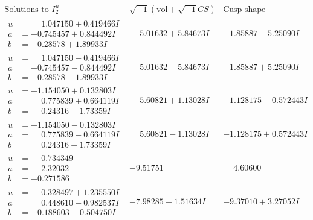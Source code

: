 \documentclass[1p]{elsarticle_modified}
\theoremstyle{definition}
\newcommand{\I}{\sqrt{-1}}
\begin{document}
$$\begin{array}{c|c|c}  
\text{Solutions to }I^u_{2}& \I (\text{vol} + \sqrt{-1}CS) & \text{Cusp shape}\\
 \hline 
\begin{aligned}
u &= \phantom{-}1.047150 + 0.419466 I \\
a &= -0.745457 + 0.844492 I \\
b &= -0.28578 + 1.89933 I\end{aligned}
 & \phantom{-}5.01632 + 5.84673 I & -1.85887 - 5.25090 I \\ \hline\begin{aligned}
u &= \phantom{-}1.047150 - 0.419466 I \\
a &= -0.745457 - 0.844492 I \\
b &= -0.28578 - 1.89933 I\end{aligned}
 & \phantom{-}5.01632 - 5.84673 I & -1.85887 + 5.25090 I \\ \hline\begin{aligned}
u &= -1.154050 + 0.132803 I \\
a &= \phantom{-}0.775839 + 0.664119 I \\
b &= \phantom{-}0.24316 + 1.73359 I\end{aligned}
 & \phantom{-}5.60821 + 1.13028 I & -1.128175 - 0.572443 I \\ \hline\begin{aligned}
u &= -1.154050 - 0.132803 I \\
a &= \phantom{-}0.775839 - 0.664119 I \\
b &= \phantom{-}0.24316 - 1.73359 I\end{aligned}
 & \phantom{-}5.60821 - 1.13028 I & -1.128175 + 0.572443 I \\ \hline\begin{aligned}
u &= \phantom{-}0.734349\phantom{ +0.000000I} \\
a &= \phantom{-}2.32032\phantom{ +0.000000I} \\
b &= -0.271586\phantom{ +0.000000I}\end{aligned}
 & -9.51751\phantom{ +0.000000I} & \phantom{-}4.60600\phantom{ +0.000000I} \\ \hline\begin{aligned}
u &= \phantom{-}0.328497 + 1.235550 I \\
a &= \phantom{-}0.448610 - 0.982537 I \\
b &= -0.188603 - 0.504750 I\end{aligned}
 & -7.98285 - 1.51634 I & -9.37010 + 3.27052 I \\ \hline\begin{aligned}

\end{aligned}
\end{array}$$
\end{document}
